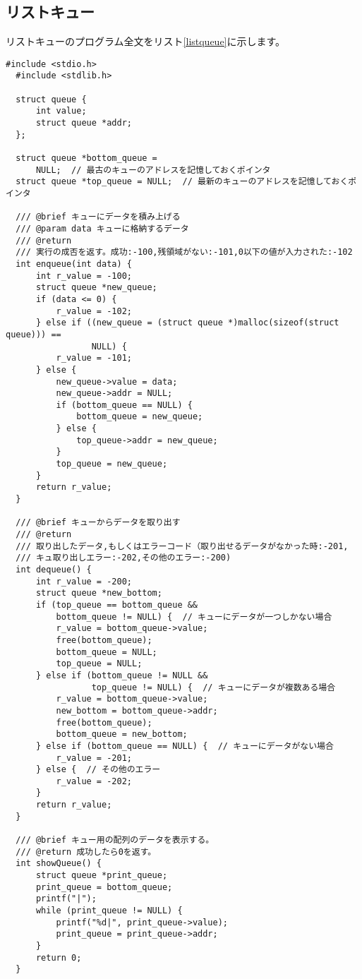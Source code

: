 \documentclass[a4j]{jarticle}
\begin{document}
\subsection{リストキュー}
リストキューのプログラム全文をリスト\ref{listqueue}に示します。

\begin{lstlisting}[caption=リストキューのプログラム,label=listqueue]
  #include <stdio.h>
  #include <stdlib.h>
  
  struct queue {
      int value;
      struct queue *addr;
  };
  
  struct queue *bottom_queue =
      NULL;  // 最古のキューのアドレスを記憶しておくポインタ
  struct queue *top_queue = NULL;  // 最新のキューのアドレスを記憶しておくポインタ
  
  /// @brief キューにデータを積み上げる
  /// @param data キューに格納するデータ
  /// @return
  /// 実行の成否を返す。成功:-100,残領域がない:-101,0以下の値が入力された:-102
  int enqueue(int data) {
      int r_value = -100;
      struct queue *new_queue;
      if (data <= 0) {
          r_value = -102;
      } else if ((new_queue = (struct queue *)malloc(sizeof(struct queue))) ==
                 NULL) {
          r_value = -101;
      } else {
          new_queue->value = data;
          new_queue->addr = NULL;
          if (bottom_queue == NULL) {
              bottom_queue = new_queue;
          } else {
              top_queue->addr = new_queue;
          }
          top_queue = new_queue;
      }
      return r_value;
  }
  
  /// @brief キューからデータを取り出す
  /// @return
  /// 取り出したデータ,もしくはエラーコード（取り出せるデータがなかった時:-201,
  /// キュ取り出しエラー:-202,その他のエラー:-200)
  int dequeue() {
      int r_value = -200;
      struct queue *new_bottom;
      if (top_queue == bottom_queue &&
          bottom_queue != NULL) {  // キューにデータが一つしかない場合
          r_value = bottom_queue->value;
          free(bottom_queue);
          bottom_queue = NULL;
          top_queue = NULL;
      } else if (bottom_queue != NULL &&
                 top_queue != NULL) {  // キューにデータが複数ある場合
          r_value = bottom_queue->value;
          new_bottom = bottom_queue->addr;
          free(bottom_queue);
          bottom_queue = new_bottom;
      } else if (bottom_queue == NULL) {  // キューにデータがない場合
          r_value = -201;
      } else {  // その他のエラー
          r_value = -202;
      }
      return r_value;
  }
  
  /// @brief キュー用の配列のデータを表示する。
  /// @return 成功したら0を返す。
  int showQueue() {
      struct queue *print_queue;
      print_queue = bottom_queue;
      printf("|");
      while (print_queue != NULL) {
          printf("%d|", print_queue->value);
          print_queue = print_queue->addr;
      }
      return 0;
  }
  

\end{lstlisting}
\end{document}
